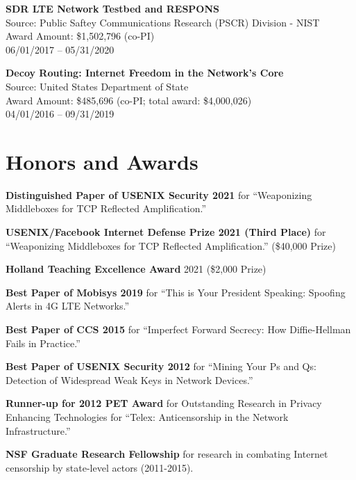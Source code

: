 \documentclass[margin,11pt]{res} %
\begin{document}
\textbf{SDR LTE Network Testbed and RESPONS} \\
Source: Public Saftey Communications Research (PSCR) Division - NIST \\
Award Amount: \$1,502,796 (co-PI) \\
06/01/2017 -- 05/31/2020

\textbf{Decoy Routing: Internet Freedom in the Network's Core} \\
Source: United States Department of State \\
Award Amount: \$485,696 (co-PI; total award: \$4,000,026) \\
04/01/2016 -- 09/31/2019



\vspace{6pt}
\section{\large Honors and Awards}


    \textbf{Distinguished Paper of USENIX Security 2021}
    for ``Weaponizing Middleboxes for TCP Reflected Amplification.''

    \textbf{USENIX/Facebook Internet Defense Prize 2021 (Third Place)}
    for ``Weaponizing Middleboxes for TCP Reflected Amplification.'' (\$40,000 Prize)

    \textbf{Holland Teaching Excellence Award} 2021 (\$2,000 Prize)

    \textbf{Best Paper of Mobisys 2019}
    for ``This is Your President Speaking: Spoofing Alerts in 4G LTE Networks.''

    \textbf{Best Paper of CCS 2015}
    for ``Imperfect Forward Secrecy: How Diffie-Hellman Fails in Practice.''

    \textbf{Best Paper of USENIX Security 2012}
    for ``Mining Your Ps and Qs: Detection of Widespread Weak Keys in Network Devices.''

    \textbf{Runner-up for 2012 PET Award} for Outstanding Research in Privacy Enhancing Technologies for ``Telex: Anticensorship in the Network Infrastructure.''


    \textbf{NSF Graduate Research Fellowship}
    for research in combating Internet censorship by state-level actors (2011-2015).
    
\end{document}
